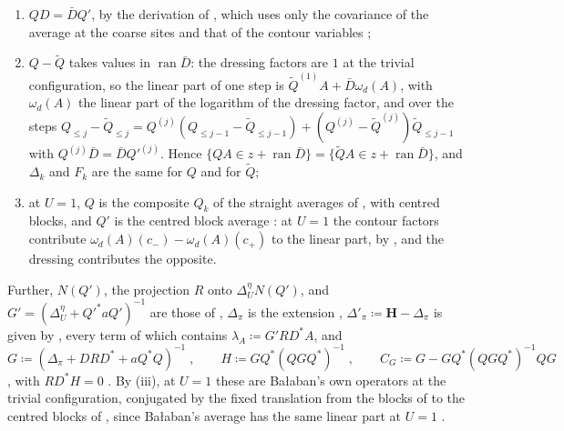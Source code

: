 \documentclass[11pt]{preprint}
\numberwithin{equation}{section}
\theoremstyle{definition}
\theoremstyle{remark}
\theoremstyle{plain}
\begin{document}
\begin{enumerate}[label=(\roman*)]
\item $QD = \bar DQ'$, by the derivation of \cite[(3.113)--(3.115), p.~418]{BalabanPBG}, which uses only the covariance of the average at the coarse sites and that of the contour variables \cite[(0.6)]{BalabanRG1};
\item $Q - \tilde Q$ takes values in $\operatorname{ran}\bar D$: the dressing factors are $1$ at the trivial configuration, so the linear part of one step is $\tilde Q^{(1)}A + \bar D\omega_d(A)$, with $\omega_d(A)$ the linear part of the logarithm of the dressing factor, and over the steps $Q_{\leq j} - \tilde Q_{\leq j} = Q^{(j)}(Q_{\leq j-1} - \tilde Q_{\leq j-1}) + (Q^{(j)} - \tilde Q^{(j)})\tilde Q_{\leq j-1}$ with $Q^{(j)}\bar D = \bar DQ'^{(j)}$. Hence $\{ QA \in z + \operatorname{ran}\bar D \} = \{ \tilde QA \in z + \operatorname{ran}\bar D \}$, and $\Delta_k$ and $F_k$ are the same for $Q$ and for $\tilde Q$;
\item at $U = 1$, $Q$ is the composite $Q_k$ of the straight averages of \cite[(1.16)--(1.18), p.~20]{BalabanPRT1}, with centred blocks, and $Q'$ is the centred block average \cite[(1.20)]{BalabanPRT1}: at $U = 1$ the contour factors contribute $\omega_d(A)(c_-) - \omega_d(A)(c_+)$ to the linear part, by \cite[(0.8)]{BalabanRG1}, and the dressing contributes the opposite.
\end{enumerate}
Further, $N(Q')$, the projection $R$ onto $\Delta^\eta_UN(Q')$, and $G' = (\Delta^\eta_U + Q'^*aQ')^{-1}$ are those of \cite[(3.21)--(3.25), p.~394]{BalabanPBG}, $\Delta_\pi$ is the extension \cite[(3.119), p.~419]{BalabanPBG}, $\Delta'_\pi \coloneqq \mathbf H - \Delta_\pi$ is given by \cite[(3.120)]{BalabanPBG}, every term of which contains $\lambda_A \coloneqq G'RD^*A$, and
\begin{equation}\label{eq:pbg-propagators}
    G \coloneqq (\Delta_\pi + DRD^* + aQ^*Q)^{-1}\;,
    \qquad
    H \coloneqq GQ^*(QGQ^*)^{-1}\;,
    \qquad
    C_G \coloneqq G - GQ^*(QGQ^*)^{-1}QG
\end{equation}
\cite[(3.122), (3.126), p.~420]{BalabanPBG}, with $RD^*H = 0$ \cite[(3.124)]{BalabanPBG}. By (iii), at $U = 1$ these are Ba{\l}aban's own operators at the trivial configuration, conjugated by the fixed translation from the blocks of \cite[(2), p.~17]{BalabanAVG} to the centred blocks of \cite{BalabanRG1}, since Ba{\l}aban's average has the same linear part at $U = 1$ \cite[(124), p.~36]{BalabanAVG}.
\end{document}
